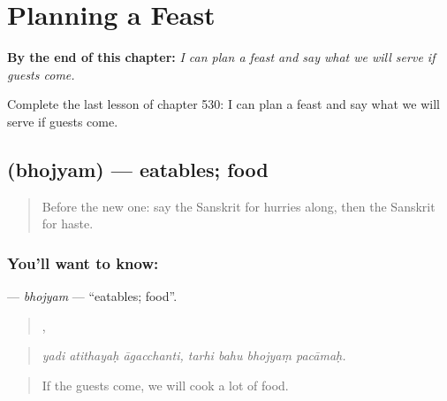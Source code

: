
\chapter{Planning a Feast}
\label{ch:sa-planning-a-feast}

\begin{chapteropening}
\textbf{By the end of this chapter:} \emph{I can plan a feast and say what we will serve if guests come.}

Complete the last lesson of chapter 530: I can plan a feast and say what we will serve if guests come.
\end{chapteropening}

\section[\texorpdfstring{\sk{भोज्यम्} (bhojyam)}{भोज्यम् (bhojyam)}]{ (bhojyam) — eatables; food}

\label{lesson:SA-C530-bhojyam}



\begin{quote}
Before the new one: say the Sanskrit for hurries along, then the Sanskrit for haste.
\end{quote}

\subsection*{You'll want to know: }
\textbf{} — \emph{bhojyam} — \textquotedblleft{}eatables; food\textquotedblright{}.

\begin{quote}
  ,    
\end{quote}

\begin{quote}
\emph{yadi atithayaḥ āgacchanti, tarhi bahu bhojyaṃ pacāmaḥ.}
\end{quote}

\begin{quote}
If the guests come, we will cook a lot of food.
\end{quote}

